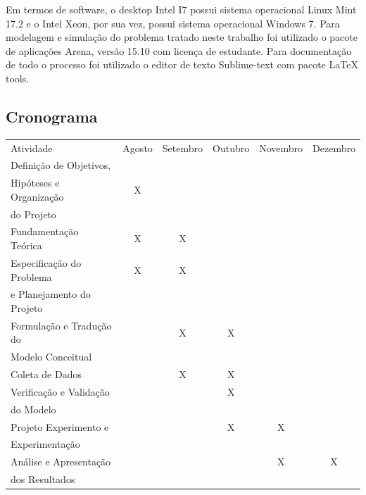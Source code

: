 \documentclass[pt,disc,oneside]{ufscpgeasthesis}
\begin{document}
                Em termos de software, o desktop Intel I7 possui sistema operacional Linux Mint 17.2 e o Intel Xeon, por sua vez, possui sistema operacional Windows 7.
                Para modelagem e simulação do problema tratado neste trabalho foi utilizado o pacote de aplicações Arena, versão 15.10 com licença de estudante.
                Para documentação de todo o processo foi utilizado o editor de texto Sublime-text com pacote LaTeX tools.

            \subsection{Cronograma}
            \label{subsec:cronograma}

				\begin{table}[h]
					\centering
					\begin{tabular}{l|c|c|c|c|c}
						\rowcolor{gray!70} Atividade				 & Agosto 	& Setembro 	& Outubro 	& Novembro 	& Dezembro \\
                    	\rowcolor{gray!20} Definição de Objetivos,	 &		&		&		&		&		\\
                    	\rowcolor{gray!20} Hipóteses e Organização 	 & X 	&		&		&		&		\\
                    	\rowcolor{gray!20} do Projeto				 &		&		&		&		&		\\
                    	\rowcolor{gray!40} Fundamentação Teórica 	 & X 	& X 	&		&		&		\\
                    	\rowcolor{gray!20} Especificação do Problema & X 	& X 	&  		&		&		\\
                    	\rowcolor{gray!20} e Planejamento do Projeto &  	&		&  		&		&		\\
                    	\rowcolor{gray!40} Formulação e Tradução do  &		& X 	& X 	&		&		\\
                    	\rowcolor{gray!40} Modelo Conceitual 		 &		&   	&   	&		&		\\
                    	\rowcolor{gray!20} Coleta de Dados			 &		& X 	& X 	& 		&		\\
                    	\rowcolor{gray!40} Verificação e Validação	 & 		&		& X 	&		&		\\
                    	\rowcolor{gray!40} do Modelo 				 &		&		&   	&		&		\\
                    	\rowcolor{gray!20} Projeto Experimento e	 &		&		& X 	& X 	&		\\
                    	\rowcolor{gray!20} Experimentação			 &		&		&   	&   	&		\\
                    	\rowcolor{gray!40} Análise e Apresentação	 &  	&		&		& X 	& X 	\\
                    	\rowcolor{gray!40} dos Resultados 			 &  	&		&		&   	& 
					\end{tabular}
                \end{table}
\end{document}
